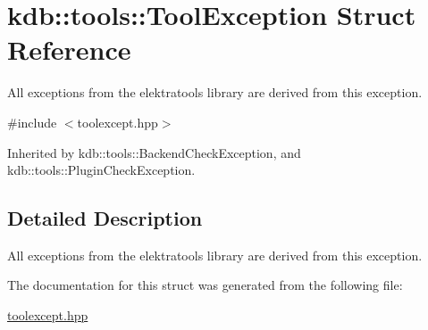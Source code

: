 \hypertarget{structkdb_1_1tools_1_1ToolException}{\section{kdb\-:\-:tools\-:\-:Tool\-Exception Struct Reference}
\label{structkdb_1_1tools_1_1ToolException}
}


All exceptions from the elektratools library are derived from this exception.  




{\ttfamily \#include $<$toolexcept.\-hpp$>$}



Inherited by kdb\-::tools\-::\-Backend\-Check\-Exception, and kdb\-::tools\-::\-Plugin\-Check\-Exception.



\subsection{Detailed Description}
All exceptions from the elektratools library are derived from this exception. 

The documentation for this struct was generated from the following file\-:\begin{DoxyCompactItemize}
\item 
\hyperlink{toolexcept_8hpp}{toolexcept.\-hpp}\end{DoxyCompactItemize}
